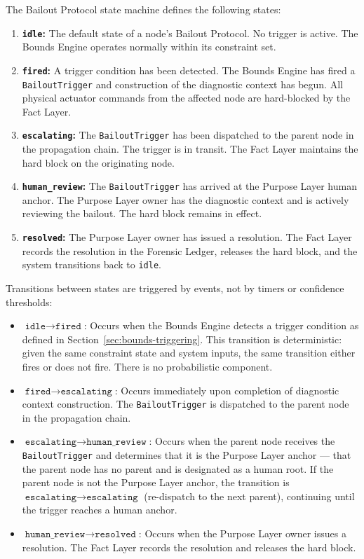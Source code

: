 The Bailout Protocol state machine defines the following states:

\begin{enumerate}
\item \textbf{\texttt{idle}:} The default state of a node's Bailout Protocol. No trigger is active. The Bounds Engine operates normally within its constraint set.
\item \textbf{\texttt{fired}:} A trigger condition has been detected. The Bounds Engine has fired a \texttt{BailoutTrigger} and construction of the diagnostic context has begun. All physical actuator commands from the affected node are hard-blocked by the Fact Layer.
\item \textbf{\texttt{escalating}:} The \texttt{BailoutTrigger} has been dispatched to the parent node in the propagation chain. The trigger is in transit. The Fact Layer maintains the hard block on the originating node.
\item \textbf{\texttt{human\_review}:} The \texttt{BailoutTrigger} has arrived at the Purpose Layer human anchor. The Purpose Layer owner has the diagnostic context and is actively reviewing the bailout. The hard block remains in effect.
\item \textbf{\texttt{resolved}:} The Purpose Layer owner has issued a resolution. The Fact Layer records the resolution in the Forensic Ledger, releases the hard block, and the system transitions back to \texttt{idle}.
\end{enumerate}

Transitions between states are triggered by events, not by timers or confidence thresholds:

\begin{itemize}
\item $\texttt{idle} \rightarrow \texttt{fired}$: Occurs when the Bounds Engine detects a trigger condition as defined in Section~\ref{sec:bounds-triggering}. This transition is deterministic: given the same constraint state and system inputs, the same transition either fires or does not fire. There is no probabilistic component.
\item $\texttt{fired} \rightarrow \texttt{escalating}$: Occurs immediately upon completion of diagnostic context construction. The \texttt{BailoutTrigger} is dispatched to the parent node in the propagation chain.
\item $\texttt{escalating} \rightarrow \texttt{human\_review}$: Occurs when the parent node receives the \texttt{BailoutTrigger} and determines that it is the Purpose Layer anchor --- that the parent node has no parent and is designated as a human root. If the parent node is not the Purpose Layer anchor, the transition is $\texttt{escalating} \rightarrow \texttt{escalating}$ (re-dispatch to the next parent), continuing until the trigger reaches a human anchor.
\item $\texttt{human\_review} \rightarrow \texttt{resolved}$: Occurs when the Purpose Layer owner issues a resolution. The Fact Layer records the resolution and releases the hard block.
\end{itemize}

